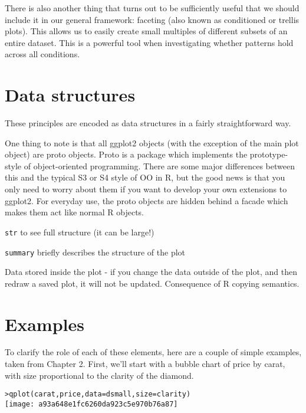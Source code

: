 There is also another thing that turns out to be sufficiently useful that we should include it in our general framework: faceting (also known as conditioned or trellis plots). This allows us to easily create small multiples of different subsets of an entire dataset. This is a powerful tool when investigating whether patterns hold across all conditions.


\section{Data structures}
\label{sec:data_structures}

These principles are encoded as data structures in a fairly straightforward way.

One thing to note is that all ggplot2 objects (with the exception of the main plot object) are proto objects.  Proto is a package which implements the prototype-style of object-oriented programming.  There are some major differences between this and the typical S3 or S4 style of OO in R, but the good news is that you only need to worry about them if you want to develop your own extensions to ggplot2.  For everyday use, the proto objects are hidden behind a facade which makes them act like normal R objects.

{\tt str} to see full structure (it can be large!)

{\tt summary} briefly describes the structure of the plot

Data stored inside the plot - if you change the data outside of the plot, and then redraw a saved plot, it will not be updated.  Consequence of R copying semantics.

\section{Examples}
\label{sec:examples}


To clarify the role of each of these elements, here are a couple of simple examples, taken from Chapter 2.  First, we'll start with a bubble chart of price by carat, with size proportional to the clarity of the diamond.

\begin{alltt}
> qplot(carat, price, data = dsmall, size = clarity)
\texttt{[image: a93a648e1fc6260da923c5e970b76a87]}

\end{alltt}

